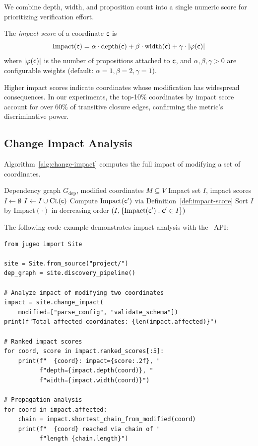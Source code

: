 \documentclass[11pt]{article}
\newcommand{\DepDepth}{\mathrm{depth}}
\newcommand{\DepWidth}{\mathrm{width}}
\begin{document}
We combine depth, width, and proposition count into a single numeric score
for prioritizing verification effort.

\begin{definition}\label{def:impact-score}
The \emph{impact score} of a coordinate $\mathsf{c}$ is
\[
  \mathrm{Impact}(\coord) = \alpha \cdot \DepDepth(\coord) +
  \beta \cdot \DepWidth(\coord) + \gamma \cdot |\prop(\coord)|
\]
where $|\varphi(\mathsf{c})|$ is the number of propositions attached to $\mathsf{c}$,
and $\alpha, \beta, \gamma > 0$ are configurable weights (default:
$\alpha = 1, \beta = 2, \gamma = 1$).
\end{definition}

Higher impact scores indicate coordinates whose modification has widespread
consequences.  In our experiments, the top-10\% coordinates by impact score
account for over 60\% of transitive closure edges, confirming the metric's
discriminative power.

\subsection{Change Impact Analysis}\label{sec:change-impact}

Algorithm~\ref{alg:change-impact} computes the full impact of modifying a
set of coordinates.

\begin{algorithm}[H]
\caption{Change Impact Analysis}\label{alg:change-impact}
\begin{algorithmic}[1]
\REQUIRE Dependency graph $G_{\mathrm{dep}}$, modified coordinates $M \subseteq V$
\ENSURE Impact set $I$, impact scores
\STATE $I \leftarrow \emptyset$
  \STATE $I \leftarrow I \cup \textsc{Cl}(\mathsf{c})$ 
\ENDFOR
{}
  \STATE Compute $\mathrm{Impact}(\mathsf{c}')$ via Definition~\ref{def:impact-score}
\ENDFOR
\STATE Sort $I$ by $\mathrm{Impact}(\cdot)$ in decreasing order
\RETURN $(I, \{\mathrm{Impact}(\mathsf{c}') : \mathsf{c}' \in I\})$
\end{algorithmic}
\end{algorithm}

The following code example demonstrates impact analysis with the \JuGeo\ API:

\begin{lstlisting}[style=jugeo-python]
from jugeo import Site

site = Site.from_source("project/")
dep_graph = site.discovery_pipeline()

# Analyze impact of modifying two coordinates
impact = site.change_impact(
    modified=["parse_config", "validate_schema"])
print(f"Total affected coordinates: {len(impact.affected)}")

# Ranked impact scores
for coord, score in impact.ranked_scores[:5]:
    print(f"  {coord}: impact={score:.2f}, "
          f"depth={impact.depth(coord)}, "
          f"width={impact.width(coord)}")

# Propagation analysis
for coord in impact.affected:
    chain = impact.shortest_chain_from_modified(coord)
    print(f"  {coord} reached via chain of "
          f"length {chain.length}")
\end{lstlisting}
\end{document}
